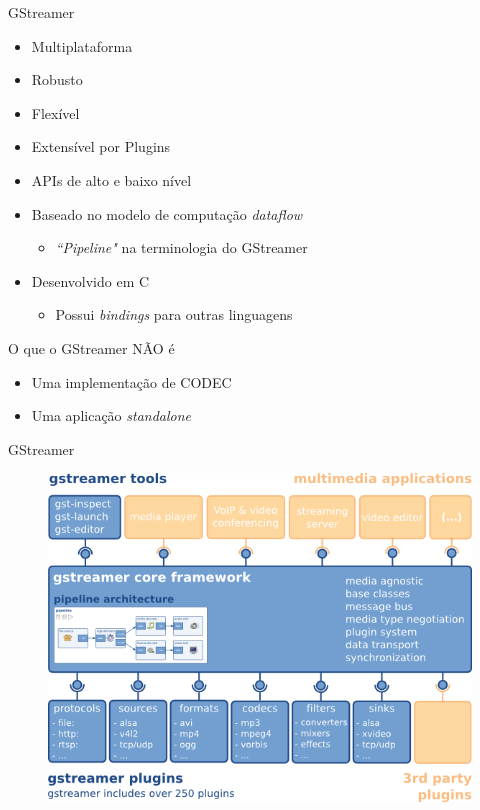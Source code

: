 \documentclass{beamer}
\def\en#1{\foreignlanguage{english}{\emph{#1}}}
\begin{document}
\begin{frame}[c]{GStreamer}
  \begin{itemize}
    \item Multiplataforma 
    \item Robusto
    \item Flexível
    \item Extensível por Plugins
    \item APIs de alto e baixo nível
    \item Baseado no modelo de computação \en{dataflow} 
      \begin{itemize}
        \item \en{``Pipeline"} na terminologia do GStreamer
      \end{itemize}
    \item Desenvolvido em C
      \begin{itemize}
        \item Possui \en{bindings} para outras linguagens
      \end{itemize}
  \end{itemize}

  \begin{block}{O que o GStreamer NÃO é}
    \begin{itemize}
      \item Uma implementação de CODEC
      \item Uma aplicação \en{standalone}
    \end{itemize}
  \end{block}
\end{frame}

\begin{frame}[c]{GStreamer}
  \begin{figure}
    \centering
    \includegraphics[scale=0.5]{figs/gstreamer-overview}
  \end{figure}
\end{frame}
\end{document}

